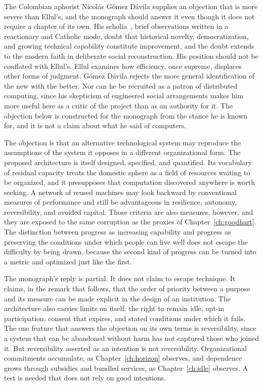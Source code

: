 The Colombian aphorist Nicolás Gómez Dávila supplies an objection that is more severe than Ellul's, and the monograph should answer it even though it does not require a chapter of its own. His scholia~\cite{gomezdavila1977}, brief observations written in a reactionary and Catholic mode, doubt that historical novelty, democratization, and growing technical capability constitute improvement, and the doubt extends to the modern faith in deliberate social reconstruction. His position should not be conflated with Ellul's. Ellul examines how efficiency, once supreme, displaces other forms of judgment. Gómez Dávila rejects the more general identification of the new with the better. Nor can he be recruited as a patron of distributed computing, since his skepticism of engineered social arrangements makes him more useful here as a critic of the project than as an authority for it. The objection below is constructed for the monograph from the stance he is known for, and it is not a claim about what he said of computers.

The objection is that an alternative technological system may reproduce the assumptions of the system it opposes in a different organizational form. The proposed architecture is itself designed, specified, and quantified. Its vocabulary of residual capacity treats the domestic sphere as a field of resources waiting to be organized, and it presupposes that computation discovered anywhere is worth seeking. A network of reused machines may look backward by conventional measures of performance and still be advantageous in resilience, autonomy, reversibility, and avoided capital. Those criteria are also measures, however, and they are exposed to the same corruption as the proxies of Chapter~\ref{ch:goodhart}. The distinction between progress as increasing capability and progress as preserving the conditions under which people can live well does not escape the difficulty by being drawn, because the second kind of progress can be turned into a metric and optimized just like the first.

The monograph's reply is partial. It does not claim to escape technique. It claims, in the remark that follows, that the order of priority between a purpose and its measure can be made explicit in the design of an institution. The architecture also carries limits on itself: the right to remain idle, opt-in participation, consent that expires, and stated conditions under which it fails. The one feature that answers the objection on its own terms is reversibility, since a system that can be abandoned without harm has not captured those who joined it. But reversibility asserted as an intention is not reversibility. Organizational commitments accumulate, as Chapter~\ref{ch:horizon} observes, and dependence grows through subsidies and bundled services, as Chapter~\ref{ch:idle} observes. A test is needed that does not rely on good intentions.


